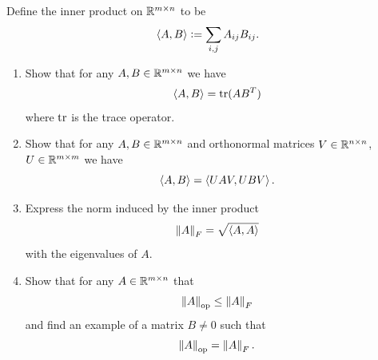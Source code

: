 \documentclass[11pt, a4paper]{article}
\begin{document}
\begin{exercise}
  Define the inner product on $\mathbb{R}^{m \times n}$ to be
  \[
    \left\langle A, B \right\rangle := \sum_{i,j} A_{ij} B_{ij}.
  \]
  \begin{enumerate}
    \item[(1)] Show that for any $A,B \in \mathbb{R}^{m \times n}$ we have
      \[
        \left\langle A, B \right\rangle = \operatorname{tr}(AB^T)
      \]
      where $\operatorname{tr}$ is the trace operator.
    \item[(2)] Show that for any $A,B \in \mathbb{R}^{m \times n}$ and orthonormal
      matrices $V \in \mathbb{R}^{n \times n}$, $U \in \mathbb{R}^{m \times m}$ we have
      \[
        \left\langle A, B \right\rangle = \left\langle U A V, U B V \right\rangle.
      \]
    \item[(3)] Express the norm induced by the inner product
      \[
        \left\lVert A\right\rVert_{F} = \sqrt{\left\langle A, A \right\rangle}
      \]
      with the eigenvalues of $A$.
    \item[(4)] Show that for any $A \in \mathbb{R}^{m \times n}$ that
      \[
        \left\lVert A\right\rVert_{\operatorname{op}} \le \left\lVert A\right\rVert_{F}
      \]
      and find an example of a matrix $B \neq 0$ such that
      \[
        \left\lVert A\right\rVert_{\operatorname{op}} = \left\lVert A\right\rVert_{F}.
      \]
  \end{enumerate}
\end{exercise}
\end{document}
